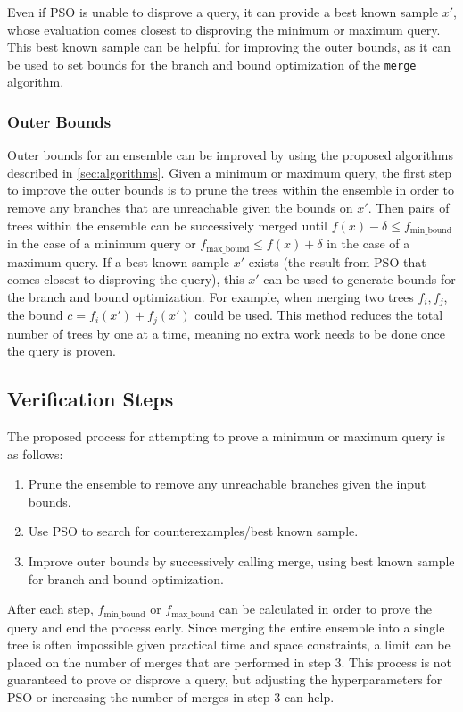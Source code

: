 \documentclass[pageno]{jpaper}
\newcommand{\fminb}{f_{\textrm{min\_bound}}}
\newcommand{\fmaxb}{f_{\textrm{max\_bound}}}
\begin{document}
\begin{doublespacing}
Even if PSO is unable to disprove a query, it can provide a best known sample $x'$, whose evaluation comes closest to disproving the minimum or maximum query. This best known sample can be helpful for improving the outer bounds, as it can be used to set bounds for the branch and bound optimization of the \verb|merge| algorithm.

\subsubsection{Outer Bounds}
Outer bounds for an ensemble can be improved by using the proposed algorithms described in \autoref{sec:algorithms}. Given a minimum or maximum query, the first step to improve the outer bounds is to prune the trees within the ensemble in order to remove any branches that are unreachable given the bounds on $x'$. Then pairs of trees within the ensemble can be successively merged until $f(x) - \delta \le \fminb$ in the case of a minimum query or $\fmaxb \le f(x) + \delta$ in the case of a maximum query. If a best known sample $x'$ exists (the result from PSO that comes closest to disproving the query), this $x'$ can be used to generate bounds for the branch and bound optimization. For example, when merging two trees $f_i, f_j$, the bound $c = f_i (x') + f_j (x')$ could be used. This method reduces the total number of trees by one at a time, meaning no extra work needs to be done once the query is proven.

\subsection{Verification Steps}
The proposed process for attempting to prove a minimum or maximum query is as follows:

\begin{enumerate}
\item Prune the ensemble to remove any unreachable branches given the input bounds.
\item Use PSO to search for counterexamples/best known sample.
\item Improve outer bounds by successively calling merge, using best known sample for branch and bound optimization.
\end{enumerate}

After each step, $\fminb$ or $\fmaxb$ can be calculated in order to prove the query and end the process early. Since merging the entire ensemble into a single tree is often impossible given practical time and space constraints, a limit can be placed on the number of merges that are performed in step 3. This process is not guaranteed to prove or disprove a query, but adjusting the hyperparameters for PSO or increasing the number of merges in step 3 can help.


\end{doublespacing}
\end{document}
